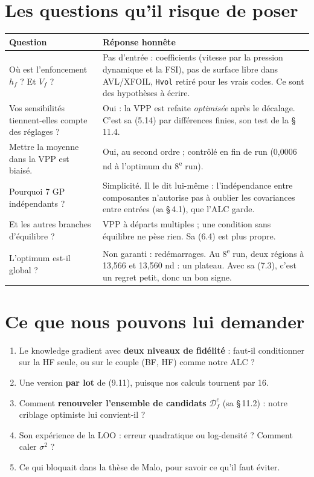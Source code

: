 \documentclass[11pt,a4paper]{article}
\newcommand{\py}[1]{\texttt{#1}}
\begin{document}
\section{Les questions qu'il risque de poser}
{\small
\begin{tabularx}{\linewidth}{@{}>{\raggedright\arraybackslash}p{5.0cm}>{\raggedright\arraybackslash}X@{}}
\toprule
Question & Réponse honnête \\
\midrule
Où est l'enfoncement $h_f$ ? Et $V_f$ ? & Pas d'entrée : coefficients (vitesse par la pression dynamique et la FSI), pas de surface libre dans AVL/XFOIL, \py{Hvol} retiré pour les vrais codes. Ce sont des hypothèses à écrire. \\
Vos sensibilités tiennent-elles compte des réglages ? & Oui : la VPP est refaite \emph{optimisée} après le décalage. C'est sa (5.14) par différences finies, son test de la §\,11.4. \\
Mettre la moyenne dans la VPP est biaisé. & Oui, au second ordre ; contrôlé en fin de run (0,0006 nd à l'optimum du 8\textsuperscript{e} run). \\
Pourquoi 7 GP indépendants ? & Simplicité. Il le dit lui-même : l'indépendance entre composantes n'autorise pas à oublier les covariances entre entrées (sa §\,4.1), que l'ALC garde. \\
Et les autres branches d'équilibre ? & VPP à départs multiples ; une condition sans équilibre ne pèse rien. Sa (6.4) est plus propre. \\
L'optimum est-il global ? & Non garanti : redémarrages. Au 8\textsuperscript{e} run, deux régions à 13,566 et 13,560 nd : un plateau. Avec sa (7.3), c'est un regret petit, donc un bon signe. \\
\bottomrule
\end{tabularx}}

\section{Ce que nous pouvons lui demander}
\begin{enumerate}
  \item Le knowledge gradient avec \textbf{deux niveaux de fidélité} : faut-il conditionner sur la HF seule,
        ou sur le couple (BF, HF) comme notre ALC ?
  \item Une version \textbf{par lot} de (9.11), puisque nos calculs tournent par 16.
  \item Comment \textbf{renouveler l'ensemble de candidats} $\mathcal D_f^c$ (sa §\,11.2) : notre criblage
        optimiste lui convient-il ?
  \item Son expérience de la LOO : erreur quadratique ou log-densité ? Comment caler $\sigma^2$ ?
  \item Ce qui bloquait dans la thèse de Malo, pour savoir ce qu'il faut éviter.
\end{enumerate}
\end{document}
